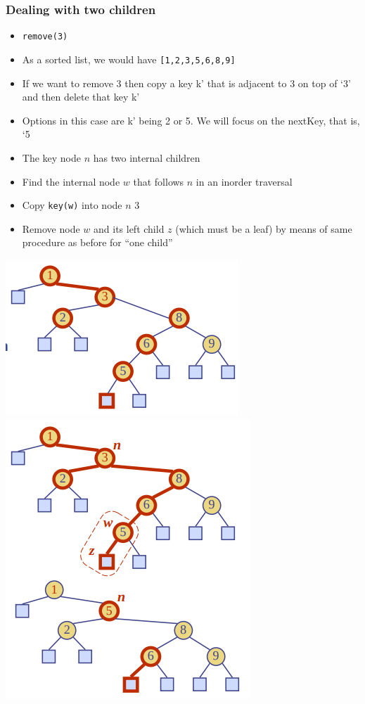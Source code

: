 \documentclass{article}
\begin{document}
	\subsubsection{Dealing with two children}
	\begin{multicols}{2}
	\begin{itemize}
		\item \texttt{remove(3)}
		\item As a sorted list, we would have \texttt{[1,2,3,5,6,8,9]}
		\item If we want to remove 3 then copy a key k’ that is adjacent to 3 on top of ‘3’ and then delete that key k’
		\item Options in this case are k’ being 2 or 5. We will focus on the nextKey, that is, ‘5
		\item The key node $n$ has two internal children
		\item Find the internal node $w$ that follows $n$ in an inorder traversal
		\item Copy \texttt{key(w)} into node $n$ 3
		\item Remove node $w$ and its left child $z$ (which must be a leaf) by means of same procedure as before for “one child”
	\end{itemize}
	\bigskip
	\begin{center}
		\includegraphics[scale=0.5]{binary_remove_2_children_base.png}
		\includegraphics[scale=0.5]{binary_remove_2_children_flow.png}	
	\end{center}		
	\end{multicols}
	
\end{document}
